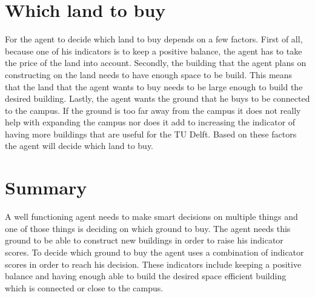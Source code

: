 \documentclass{article}
\begin{document}
\section{Which land to buy}
For the agent to decide which land to buy depends on a few factors. First of all, because one of his indicators is to keep a positive balance, the agent has to take the price of the land into account. Secondly, the building that the agent plans on constructing on the land needs to have enough space to be build. This means that the land that the agent wants to buy needs to be large enough to build the desired building. Lastly, the agent wants the ground that he buys to be connected to the campus. If the ground is too far away from the campus it does not really help with expanding the campus nor does it add to increasing the indicator of having more buildings that are useful for the TU Delft. Based on these factors the agent will decide which land to buy. 

\section{Summary}
A well functioning agent needs to make smart decisions on multiple things and one of those things is deciding on which ground to buy. The agent needs this ground to be able to construct new buildings in order to raise his indicator scores. To decide which ground to buy the agent uses a combination of indicator scores in order to reach his decision. These indicators include keeping a positive balance and having enough able to build the desired space efficient building which is connected or close to the campus.
\end{document}
